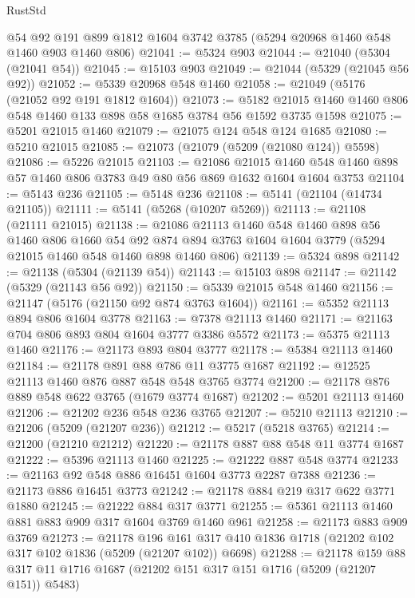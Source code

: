 \begin{lexlean}{RustStd}
\begin{coremodule}
    @54
    @92
    @191
    @899
    @1812
    @1604
    @3742
    @3785
    (@5294 @20968 @1460 @548 @1460 @903 @1460 @806)
@21041 := @5324 @903
@21044 := @21040 (@5304 (@21041 @54))
@21045 := @15103 @903
@21049 := @21044 (@5329 (@21045 @56 @92))
@21052 := @5339 @20968 @548 @1460
@21058 := @21049 (@5176 (@21052 @92 @191 @1812 @1604))
@21073 := @5182 @21015 @1460 @1460 @806 @548 @1460 @133 @898 @58 @1685 @3784 @56 @1592 @3735 @1598
@21075 := @5201 @21015 @1460
@21079 := @21075 @124 @548 @124 @1685
@21080 := @5210 @21015
@21085 := @21073 (@21079 (@5209 (@21080 @124)) @5598)
@21086 := @5226 @21015
@21103 := @21086
    @21015
    @1460
    @548
    @1460
    @898
    @57
    @1460
    @806
    @3783
    @49
    @80
    @56
    @869
    @1632
    @1604
    @1604
    @3753
@21104 := @5143 @236
@21105 := @5148 @236
@21108 := @5141 (@21104 (@14734 @21105))
@21111 := @5141 (@5268 (@10207 @5269))
@21113 := @21108 (@21111 @21015)
@21138 := @21086
    @21113
    @1460
    @548
    @1460
    @898
    @56
    @1460
    @806
    @1660
    @54
    @92
    @874
    @894
    @3763
    @1604
    @1604
    @3779
    (@5294 @21015 @1460 @548 @1460 @898 @1460 @806)
@21139 := @5324 @898
@21142 := @21138 (@5304 (@21139 @54))
@21143 := @15103 @898
@21147 := @21142 (@5329 (@21143 @56 @92))
@21150 := @5339 @21015 @548 @1460
@21156 := @21147 (@5176 (@21150 @92 @874 @3763 @1604))
@21161 := @5352 @21113 @894 @806 @1604 @3778
@21163 := @7378 @21113 @1460
@21171 := @21163 @704 @806 @893 @804 @1604 @3777 @3386 @5572
@21173 := @5375 @21113 @1460
@21176 := @21173 @893 @804 @3777
@21178 := @5384 @21113 @1460
@21184 := @21178 @891 @88 @786 @11 @3775 @1687
@21192 := @12525 @21113 @1460 @876 @887 @548 @548 @3765 @3774
@21200 := @21178 @876 @889 @548 @622 @3765 (@1679 @3774 @1687)
@21202 := @5201 @21113 @1460
@21206 := @21202 @236 @548 @236 @3765
@21207 := @5210 @21113
@21210 := @21206 (@5209 (@21207 @236))
@21212 := @5217 (@5218 @3765)
@21214 := @21200 (@21210 @21212)
@21220 := @21178 @887 @88 @548 @11 @3774 @1687
@21222 := @5396 @21113 @1460
@21225 := @21222 @887 @548 @3774
@21233 := @21163 @92 @548 @886 @16451 @1604 @3773 @2287 @7388
@21236 := @21173 @886 @16451 @3773
@21242 := @21178 @884 @219 @317 @622 @3771 @1880
@21245 := @21222 @884 @317 @3771
@21255 := @5361 @21113 @1460 @881 @883 @909 @317 @1604 @3769 @1460 @961
@21258 := @21173 @883 @909 @3769
@21273 := @21178
    @196
    @161
    @317
    @410
    @1836
    @1718
    (@21202 @102 @317 @102 @1836 (@5209 (@21207 @102)) @6698)
@21288 := @21178
    @159
    @88
    @317
    @11
    @1716
    @1687
    (@21202 @151 @317 @151 @1716 (@5209 (@21207 @151)) @5483)

\end{coremodule}
\end{lexlean}
